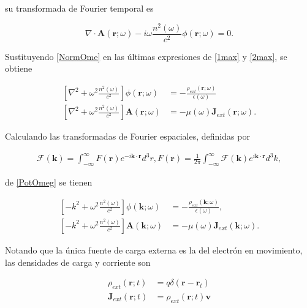 \documentclass[a4paper,10pt]{article}
\begin{document}
su transformada de Fourier temporal es

\begin{equation}
\nabla\cdot\textbf{A}(\textbf{r};\omega)-i\omega\frac{n^2(\omega)}{c^2}\phi(\textbf{r};\omega)=0.
\label{NormOme}
\end{equation}

Sustituyendo \eqref{NormOme} en las últimas expresiones de \eqref{1max} y \eqref{2max}, se obtiene

\begin{subequations}
\begin{align}
\left[ \nabla^2+\omega^2\frac{n^2(\omega)}{c^2}\right] \phi(\textbf{r};\omega) &=-\frac{\rho_{ext}(\textbf{r};\omega)}{\epsilon(\omega)}	\label{59a}	\\
\left[ \nabla^2+\omega^2\frac{n^2(\omega)}{c^2}\right]\textbf{A}(\textbf{r};\omega) &=-\mu(\omega)\textbf{J}_{ext}(\textbf{r};\omega).
\end{align}
\label{PotOmeg}
\end{subequations}

Calculando las transformadas de Fourier espaciales, definidas por

\begin{subequations}
\begin{align}
\mathcal{F} (\textbf{k})=\int_{-\infty}^{\infty} F(\textbf{r})e^ {-i\textbf{k}\cdot\textbf{r}} d^3r,
F(\textbf{r})=\frac{1}{2\pi}\int_{-\infty}^{\infty} \mathcal{F}(\textbf{k})e^ {i\textbf{k}\cdot\textbf{r}} d^3k,
\end{align}
\end{subequations}

de \eqref{PotOmeg} se tienen

\begin{subequations}
\begin{align}
\left[ -k^2+\omega^2\frac{n^2(\omega)}{c^2}\right] \phi(\textbf{k};\omega)&=-\frac{\rho_{ext}(\textbf{k};\omega)}{\epsilon(\omega)},	\\
\left[ -k^2+\omega^2\frac{n^2(\omega)}{c^2}\right]\textbf{A}(\textbf{k};\omega)&=-\mu(\omega)\textbf{J}_{ext}(\textbf{k};\omega).
\end{align}
\label{PotOmeK}
\end{subequations}

Notando que la única fuente de carga externa es la del electrón en movimiento, las densidades de carga y corriente son

\begin{subequations}
\begin{align}
\rho_{ext}(\textbf{r};t)&=q\delta(\textbf{r}-\textbf{r}_t)	\label{Eq2.13a}	\\
\textbf{J}_{ext}(\textbf{r};t)&=\rho_{ext}(\textbf{r};t) \textbf{v}	\label{Eq2.13b}
\end{align}
\label{densidadesreales}
\end{subequations}
\end{document}
